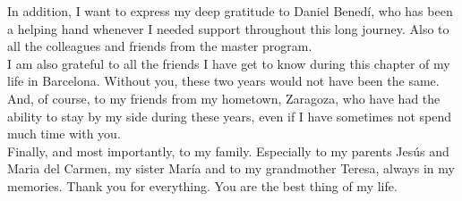 \documentclass[12pt,a4paper]{article}
\begin{document}
In addition, I want to express my deep gratitude to Daniel Benedí, who has been a helping hand whenever I needed support throughout this long journey. Also to all the colleagues and friends from the master program.\\

I am also grateful to all the friends I have get to know during this chapter of my life in Barcelona. Without you, these two years would not have been the same. And, of course, to my friends from my hometown, Zaragoza, who have had the ability to stay by my side during these years, even if I have sometimes not spend much time with you.\\

Finally, and most importantly, to my family. Especially to my parents Jesús and Maria del Carmen, my sister María and to my grandmother Teresa, always in my memories. Thank you for everything. You are the best thing of my life.

\newpage

\tableofcontents

\newpage










\newpage
\printbibliography 

%
\end{document}
